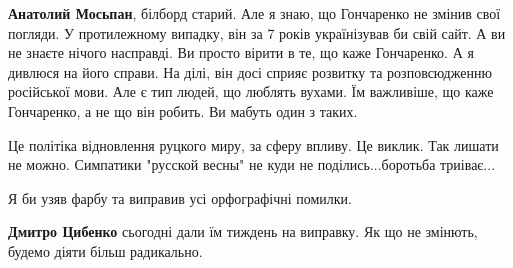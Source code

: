 \begin{itemize}
\begin{itemize}
\textbf{Анатолий Мосьпан}, білборд старий. Але я знаю, що Гончаренко не змінив
свої погляди. У протилежному випадку, він за 7 років українізував би свій сайт.
А ви не знаєте нічого насправді. Ви просто вірити в те, що каже Гончаренко. А я
дивлюся на його справи. На ділі, він досі сприяє розвитку та розповсюдженню
російської мови. Але є тип людей, що люблять вухами. Їм важливіше, що каже
Гончаренко, а не що він робить. Ви мабуть один з таких.
\end{itemize}

 

Це політіка відновлення руцкого миру, за сферу впливу. Це виклик. Так лишати не
можно. Симпатики "русской весны" не куди не поділись...боротьба триіває...


 
Я би узяв фарбу та виправив усі орфографічні помилки.

\begin{itemize}
 
\textbf{Дмитро Цибенко} сьогодні дали їм тиждень на виправку. Як що не змінють, будемо діяти більш радикально.
\end{itemize}

\end{itemize}

